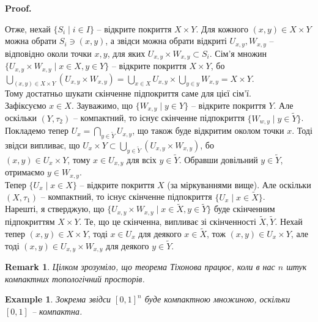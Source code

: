 \documentclass[a4paper, 10pt]{article}
\makeatletter
\theoremstyle{theoremdd}
\newtheorem{example}[theorem]{Example}
\newtheorem{remark}[theorem]{Remark}
\renewenvironment{proof}[1][Proof.\\]{\par
\pushQED{\hfill \qed}%
\normalfont \topsep6\p@\@plus6\p@\relax
\trivlist
\item\relax
{\bfseries
#1\@addpunct{.}}\hspace\labelsep\ignorespaces
}{%
\popQED\endtrivlist\@endpefalse
}
\makeatother
\begin{document}
\begin{proof}
Отже, нехай $\{S_i \mid i \in I\}$ -- відкрите покриття $X \times Y$. Для кожного $(x,y) \in X \times Y$ можна обрати $S_i \ni (x,y)$, а звідси можна обрати відкриті $U_{x,y}, W_{x,y}$ -- відповідно околи точки $x,y$, для яких $U_{x,y} \times W_{x,y} \subset S_i$. Сім'я множин $\{U_{x,y} \times W_{x,y} \mid x \in X, y \in Y\}$ -- відкрите покриття $X \times Y$, бо\\
$\displaystyle\bigcup_{(x,y) \in X \times Y} (U_{x,y} \times W_{x,y}) = \bigcup_{x \in X} U_{x,y} \times \bigcup_{y \in y} W_{x,y} = X \times Y$.\\
Тому достатньо шукати скінченне підпокриття саме для цієї сім'ї.\\
Зафіксуємо $x \in X$. Зауважимо, що $\{W_{x,y} \mid y \in Y\}$ -- відкрите покриття $Y$. Але оскільки $(Y,\tau_2)$ -- компактний, то існує скінченне підпокриття $\{W_{w,y} \mid y \in \tilde{Y}\}$. Покладемо тепер $U_x = \displaystyle\bigcap_{y \in \tilde{Y}} U_{x,y}$, що також буде відкритим околом точки $x$. Тоді звідси випливає, що $U_x \times Y \subset \displaystyle\bigcup_{y \in \tilde{Y}} (U_{x,y} \times W_{x,y})$, бо\\
$(x,y) \in U_x \times Y$, тому $x \in U_{x,y}$ для всіх $y \in \tilde{Y}$. Обравши довільний $y \in \tilde{Y}$, отримаємо $y \in W_{x,y}$.\\ 
Тепер $\{U_x \mid x \in X\}$ -- відкрите покриття $X$ (за міркуваннями вище). Але оскільки $(X,\tau_1)$ -- компактний, то існує скінченне підпокриття $\{U_x \mid x \in \tilde{X}\}$.\\
Нарешті, я стверджую, що $\{ U_{x,y} \times W_{x,y} \mid x \in \tilde{X}, y \in \tilde{Y} \}$ буде скінченним підпокриттям $X \times Y$. Те, що це скінченна, випливає зі скінченності $\tilde{X},\tilde{Y}$. Нехай тепер $(x,y) \in X \times Y$, тоді $x \in U_x$ для деякого $x \in \tilde{X}$, тож $(x,y) \in U_x \times Y$, але тоді $(x,y) \in U_{x,y} \times W_{x,y}$ для деякого $y \in \tilde{Y}$. 
\end{proof}

\begin{remark}
Цілком зрозуміло, що теорема Тіхонова працює, коли в нас $n$ штук компактних топологічний просторів.
\end{remark}

\begin{example}
Зокрема звідси $[0,1]^n$ буде компактною множиною, оскільки $[0,1]$ -- компактна.
\end{example}
\end{document}
